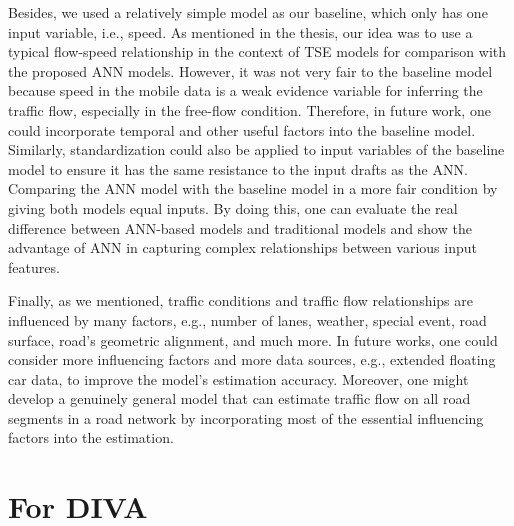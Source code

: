 \documentclass[english]{kththesis}
\begin{document}
Besides, we used a relatively simple model as our baseline, which only has one input variable, i.e., speed. As mentioned in the thesis, our idea was to use a typical flow-speed relationship in the context of TSE models for comparison with the proposed ANN models. However, it was not very fair to the baseline model because speed in the mobile data is a weak evidence variable for inferring the traffic flow, especially in the free-flow condition. Therefore, in future work, one could incorporate temporal and other useful factors into the baseline model. Similarly, standardization could also be applied to input variables of the baseline model to ensure it has the same resistance to the input drafts as the ANN. Comparing the ANN model with the baseline model in a more fair condition by giving both models equal inputs. By doing this, one can evaluate the real difference between ANN-based models and traditional models and show the advantage of ANN in capturing complex relationships between various input features.

Finally, as we mentioned, traffic conditions and traffic flow relationships are influenced by many factors, e.g., number of lanes, weather, special event, road surface, road's geometric alignment, and much more. In future works, one could consider more influencing factors and more data sources, e.g., extended floating car data, to improve the model's estimation accuracy. Moreover, one might develop a genuinely general model that can estimate traffic flow on all road segments in a road network by incorporating most of the essential influencing factors into the estimation.

\cleardoublepage


\renewcommand{\bibname}{References}



\cleardoublepage

\label{pg:lastPageofMainmatter}

\clearpage
\section*{For DIVA}
\end{document}
